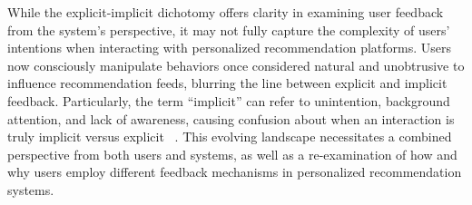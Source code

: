 While the explicit-implicit dichotomy offers clarity in examining user feedback from the system’s perspective, it may not fully capture the complexity of users' intentions when interacting with personalized recommendation platforms. Users now consciously manipulate behaviors once considered natural and unobtrusive to influence recommendation feeds, blurring the line between explicit and implicit feedback. Particularly, the term ``implicit'' can refer to unintention, background attention, and lack of awareness, causing confusion about when an interaction is truly implicit versus explicit ~\cite{serim2019explicating}. 
This evolving landscape necessitates a combined perspective from both users and systems, as well as a re-examination of how and why users employ different feedback mechanisms in personalized recommendation systems.
